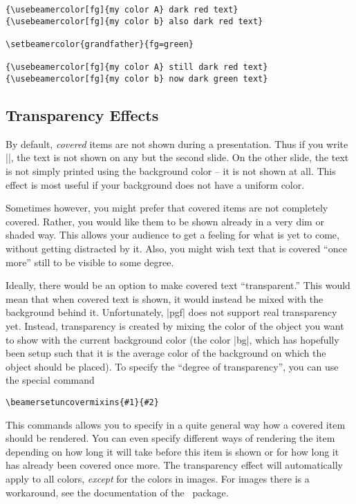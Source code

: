 \begin{command}{\setbeamercolor\opt{|*|}}
\begin{itemize}
\begin{verbatim}
{\usebeamercolor[fg]{my color A} dark red text}
{\usebeamercolor[fg]{my color b} also dark red text}

\setbeamercolor{grandfather}{fg=green}

{\usebeamercolor[fg]{my color A} still dark red text}
{\usebeamercolor[fg]{my color b} now dark green text}
\end{verbatim}
  \end{itemize}
\end{command}







\subsection{Transparency Effects}
\label{section-transparent}

By default, \emph{covered} items are not shown during a
presentation. Thus if you write ||, the text
is not shown on any but the second slide. On the other slide, the text
is not simply printed using the background color -- it is not shown at
all. This effect is most useful if your background does not have a
uniform color.

Sometimes however, you might prefer that covered items are not
completely covered. Rather, you would like them to be shown already in
a very dim or shaded way. This allows your audience to get a feeling
for what is yet to come, without getting distracted by it. Also, you
might wish text that is covered ``once more'' still to be visible to
some degree.

Ideally, there would be an option to make covered text
``transparent.'' This would mean that when covered text is shown, it
would instead be mixed with the background behind it. Unfortunately,
|pgf| does not support real transparency yet. Instead, transparency is
created by mixing the color of the object you want to show with the
current background color (the color |bg|, which has hopefully been
setup such that it is the average color of the background on which the
object should be placed). To specify the ``degree of
transparency'', you can use the special command
\begin{verbatim}
\beamersetuncovermixins{#1}{#2}
\end{verbatim}
This commands allows you to specify in a quite general way how a
covered item should be rendered. You can even specify different ways
of rendering the item depending on how long it will take before this
item is shown or for how long it has already been covered once
more. The transparency effect will automatically apply to all colors,
\emph{except} for the colors in images. For images there is a
workaround, see the documentation of the \pgf\ package. 

